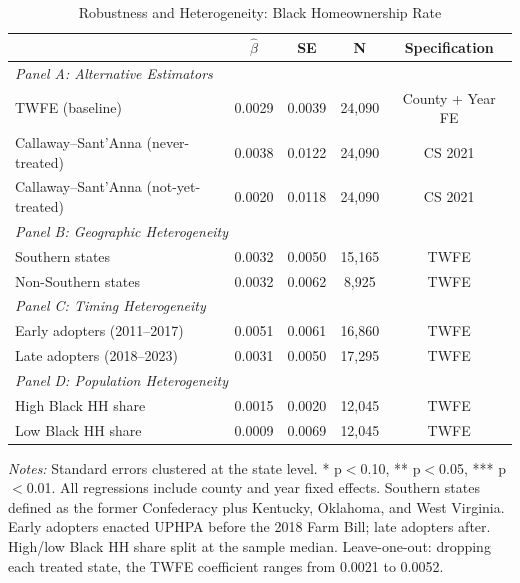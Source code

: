 
\begin{table}[H]
\centering
\caption{Robustness and Heterogeneity: Black Homeownership Rate}
\label{tab:robustness}
\begin{threeparttable}
\begin{tabular}{lcccc}
\toprule
 & $\hat{\beta}$ & SE & N & Specification \\
\midrule
\multicolumn{5}{l}{\textit{Panel A: Alternative Estimators}} \\
TWFE (baseline) & 0.0029 & 0.0039 & 24,090 & County + Year FE \\
Callaway--Sant'Anna (never-treated) & 0.0038 & 0.0122 & 24,090 & CS 2021 \\
Callaway--Sant'Anna (not-yet-treated) & 0.0020 & 0.0118 & 24,090 & CS 2021 \\
\midrule
\multicolumn{5}{l}{\textit{Panel B: Geographic Heterogeneity}} \\
Southern states & 0.0032 & 0.0050 & 15,165 & TWFE \\
Non-Southern states & 0.0032 & 0.0062 & 8,925 & TWFE \\
\midrule
\multicolumn{5}{l}{\textit{Panel C: Timing Heterogeneity}} \\
Early adopters (2011--2017) & 0.0051 & 0.0061 & 16,860 & TWFE \\
Late adopters (2018--2023) & 0.0031 & 0.0050 & 17,295 & TWFE \\
\midrule
\multicolumn{5}{l}{\textit{Panel D: Population Heterogeneity}} \\
High Black HH share & 0.0015 & 0.0020 & 12,045 & TWFE \\
Low Black HH share & 0.0009 & 0.0069 & 12,045 & TWFE \\
\bottomrule
\end{tabular}
\begin{tablenotes}[flushleft]
\small
\item \textit{Notes:} Standard errors clustered at the state level. * p$<$0.10, ** p$<$0.05, *** p$<$0.01. All regressions include county and year fixed effects. Southern states defined as the former Confederacy plus Kentucky, Oklahoma, and West Virginia. Early adopters enacted UPHPA before the 2018 Farm Bill; late adopters after. High/low Black HH share split at the sample median. Leave-one-out: dropping each treated state, the TWFE coefficient ranges from 0.0021 to 0.0052.
\end{tablenotes}
\end{threeparttable}
\end{table}
